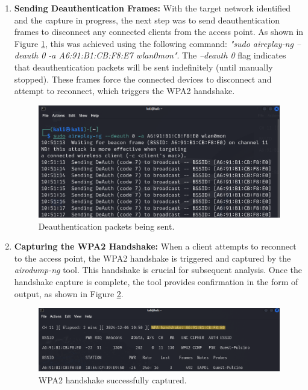\begin{enumerate}
    \item \textbf{Sending Deauthentication Frames:} With the target network identified and the capture in progress, the next step was to send deauthentication frames to disconnect any connected clients from the access point. As shown in Figure \ref{fig:deauth}, this was achieved using the following command: \textit{"sudo aireplay-ng --deauth 0 -a A6:91:B1:CB:F8:E7 wlan0mon"}. The \textit{--deauth 0} flag indicates that deauthentication packets will be sent indefinitely (until manually stopped). These frames force the connected devices to disconnect and attempt to reconnect, which triggers the WPA2 handshake.

    \begin{figure}[h!]
        \centering
        \includegraphics[width=0.8\linewidth]{images/dauth.png}
        \caption{Deauthentication packets being sent.}
        \label{fig:deauth}
    \end{figure}

    \item \textbf{Capturing the WPA2 Handshake:} When a client attempts to reconnect to the access point, the WPA2 handshake is triggered and captured by the \textit{airodump-ng} tool. This handshake is crucial for subsequent analysis. Once the handshake capture is complete, the tool provides confirmation in the form of output, as shown in Figure \ref{fig:handshakecaputred}.

    \begin{figure}[h!]
        \centering
        \includegraphics[width=0.8\linewidth]{images/handshakecaptured.png}
        \caption{WPA2 handshake successfully captured.}
        \label{fig:handshakecaputred}
    \end{figure}
    

\end{enumerate}
